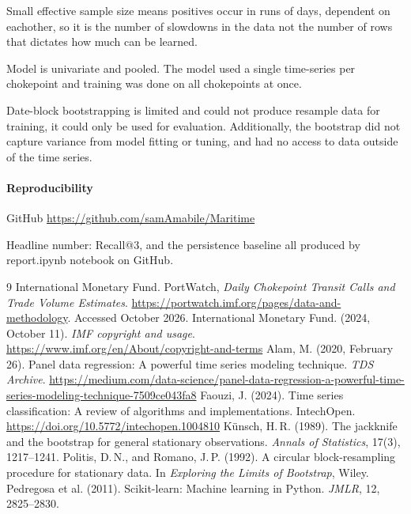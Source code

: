 \documentclass[11pt]{article}
\begin{document}
Small effective sample size means positives occur in runs of days, dependent on eachother, so it is the number of slowdowns in the data not the number of rows that dictates how much can be learned. 

Model is univariate and pooled. The model used a single time-series per chokepoint and training was done on all chokepoints at once. 

Date-block bootstrapping is limited and could not produce resample data for training, it could only be used for evaluation. Additionally, the bootstrap did not capture variance from model fitting or tuning, and had no access to data outside of the time series. 

\paragraph{Reproducibility}
GitHub \url{https://github.com/samAmabile/Maritime}

Headline number: Recall@3, and the persistence baseline all produced by report.ipynb notebook on GitHub.  



\begin{thebibliography}{9}
 International Monetary Fund. PortWatch, \emph{Daily Chokepoint Transit Calls and Trade Volume Estimates}. \url{https://portwatch.imf.org/pages/data-and-methodology}. Accessed October 2026.
 International Monetary Fund. (2024, October 11). \emph{IMF copyright and usage}. \url{https://www.imf.org/en/About/copyright-and-terms}
 Alam, M. (2020, February 26). Panel data regression: A powerful time series modeling technique. \emph{TDS Archive}. \url{https://medium.com/data-science/panel-data-regression-a-powerful-time-series-modeling-technique-7509ce043fa8}
 Faouzi, J. (2024). Time series classification: A review of algorithms and implementations. IntechOpen. \url{https://doi.org/10.5772/intechopen.1004810}
 K\"unsch, H.\,R. (1989). The jackknife and the bootstrap for general stationary observations. \emph{Annals of Statistics}, 17(3), 1217--1241.
 Politis, D.\,N., and Romano, J.\,P. (1992). A circular block-resampling procedure for stationary data. In \emph{Exploring the Limits of Bootstrap}, Wiley.
 Pedregosa et al. (2011). Scikit-learn: Machine learning in Python. \emph{JMLR}, 12, 2825--2830.
\end{thebibliography}
\end{document}
